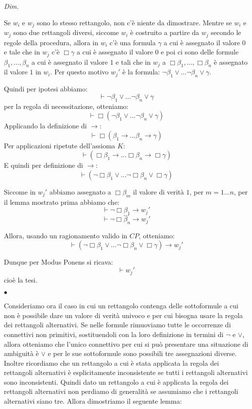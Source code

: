 \documentclass[a4paper, titlepage, 12pt]{report}
\newenvironment{proof}
    {\textit{Dim.}
    }
    {\begin{flushright}$\bullet$\end{flushright}
    }
\begin{document}
\begin{proof}
Se $w_i$ e $w_j$ sono lo stesso rettangolo, non c'è niente da dimostrare.
Mentre se $w_i$ e $w_j$ sono due rettangoli diversi, siccome $w_i$ è costruito
a partire da $w_j$ secondo le regole della procedura, allora in $w_i$ c'è
una formula $\gamma$ a cui è assegnato il valore $0$ e tale che in $w_j$ c'è
$\Box \gamma$ a cui è assegnato il valore $0$ e poi ci sono delle formule
$\beta_1, ..., \beta_n$ a cui è assegnato il valore $1$ e tali che in $w_j$
a $\Box \beta_1, ..., \Box \beta_n$ è assegnato il valore $1$ in $w_i$.
Per questo motivo $w_j'$ è la formula: $\neg \beta_1 \lor ... \neg \beta_n \lor \gamma$.

Quindi per ipotesi abbiamo:
$$\vdash \neg \beta_1 \lor ... \neg \beta_n \lor \gamma$$
per la regola di necessitazione, otteniamo:
$$\vdash \Box(\neg \beta_1 \lor ... \neg \beta_n \lor \gamma)$$
Applicando la definizione di $\rightarrow$:
$$\vdash \Box(\beta_1 \rightarrow ... \beta_n \rightarrow \gamma)$$
Per applicazioni ripetute dell'assioma $K$:
$$\vdash (\Box \beta_1 \rightarrow ... \Box \beta_n \rightarrow \Box \gamma)$$
E quindi per definizione di $\rightarrow$:
$$\vdash (\neg \Box \beta_1 \lor ... \neg \Box \beta_n \lor \Box \gamma)$$

Siccome in $w_j'$ abbiamo assegnato a $\Box \beta_m$ il valore di verità $1$, per $m = 1...n$,
per il lemma mostrato prima abbiamo che:
$$\vdash \neg \Box \beta_1 \rightarrow w_j'$$
$$...$$
$$\vdash \neg \Box \beta_n \rightarrow w_j'$$

Allora, usando un ragionamento valido in $CP$, otteniamo:
$$\vdash (\neg \Box \beta_1 \lor ... \neg \Box \beta_n \lor \Box \gamma) \rightarrow w_j'$$

Dunque per Modus Ponens si ricava:
$$\vdash w_j'$$
cioè la tesi.

\end{proof}

Consideriamo ora il caso in cui un rettangolo contenga delle sottoformule
a cui non è possibile dare un valore di verità univoco e per cui bisogna
usare la regola dei rettangoli alternativi. Se nelle formule rimuoviamo
tutte le occorrenze di connettivi non primitivi, sostituendoli con la loro definizione
in termini di $\neg$ e $\lor$, allora otteniamo che l'unico connettivo
per cui si può presentare una situazione di ambiguità è $\lor$ e per le sue sottoformule
sono possibili tre assegnazioni diverse. Inoltre ricordiamo che un rettangolo a cui è stata applicata
la regola dei rettangoli alternativi è esplicitamente inconsistente se tutti i
rettangoli alternativi sono inconsistenti. Quindi dato un rettangolo
a cui è applicata la regola dei rettangoli alternativi non perdiamo di generalità
se assumiamo che i rettangoli alternativi siano tre. Allora dimostriamo il seguente lemma:
\end{document}
